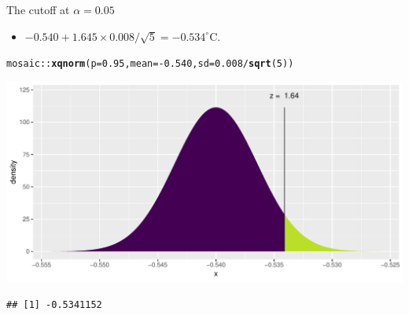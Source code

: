 \documentclass[handout]{beamer}\usepackage[]{graphicx}\usepackage[]{color}
\newcommand{\hlnum}[1]{\textcolor[rgb]{0.686,0.059,0.569}{#1}}%
\newcommand{\hlopt}[1]{\textcolor[rgb]{0,0,0}{#1}}%
\newcommand{\hlstd}[1]{\textcolor[rgb]{0.345,0.345,0.345}{#1}}%
\newcommand{\hlkwc}[1]{\textcolor[rgb]{0.333,0.667,0.333}{#1}}%
\newcommand{\hlkwd}[1]{\textcolor[rgb]{0.737,0.353,0.396}{\textbf{#1}}}%
\newenvironment{knitrout}{}{} %
\begin{document}
\begin{frame}[fragile]{The cutoff at $\alpha = 0.05$}
\begin{itemize}
	\item $-0.540 + 1.645 \times 0.008/\sqrt{5}  = -0.534^{\circ}\textrm{C}.$
\end{itemize}

\begin{knitrout}\scriptsize
{}\color{fgcolor}
\begin{alltt}
\hlstd{mosaic}\hlopt{::}\hlkwd{xqnorm}\hlstd{(}\hlkwc{p} \hlstd{=} \hlnum{0.95}\hlstd{,} \hlkwc{mean} \hlstd{=} \hlopt{-}\hlnum{0.540}\hlstd{,} \hlkwc{sd} \hlstd{=} \hlnum{0.008}\hlopt{/}\hlkwd{sqrt}\hlstd{(}\hlnum{5}\hlstd{))}
\end{alltt}


{\centering \includegraphics[width=1\linewidth]{figure/unnamed-chunk-6-1} 

}


\begin{verbatim}
## [1] -0.5341152
\end{verbatim}

\end{knitrout}
\end{frame}
\end{document}
